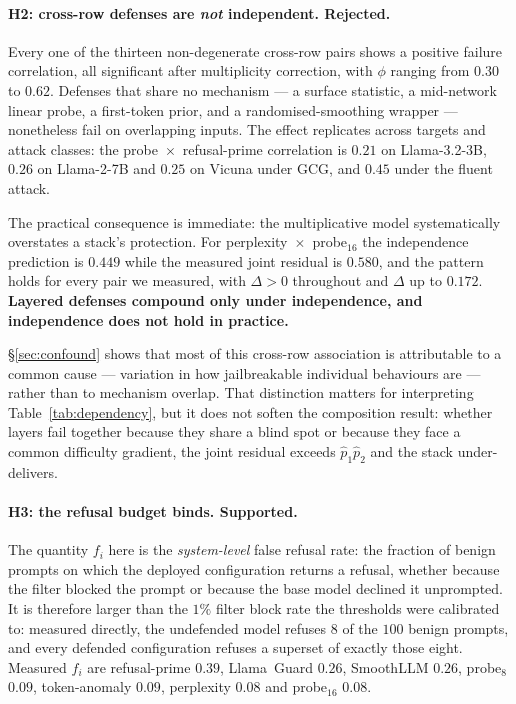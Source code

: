 \paragraph{H2: cross-row defenses are \emph{not} independent. Rejected.}
Every one of the thirteen non-degenerate cross-row pairs shows a positive failure
correlation, all significant after multiplicity correction, with $\phi$ ranging from $0.30$
to $0.62$. Defenses that share no mechanism --- a surface statistic, a mid-network linear
probe, a first-token prior, and a randomised-smoothing wrapper --- nonetheless fail on
overlapping inputs. The effect replicates across targets and attack classes: the
probe~$\times$~refusal-prime correlation is $0.21$ on Llama-3.2-3B, $0.26$ on Llama-2-7B and
$0.25$ on Vicuna under GCG, and $0.45$ under the fluent attack.

The practical consequence is immediate: the multiplicative model systematically overstates a
stack's protection. For perplexity~$\times$~probe$_{16}$ the independence prediction is
$0.449$ while the measured joint residual is $0.580$, and the pattern holds for every pair we
measured, with $\Delta>0$ throughout and $\Delta$ up to $0.172$. \textbf{Layered defenses
compound only under independence, and independence does not hold in practice.}

\S\ref{sec:confound} shows that most of this cross-row association is attributable to a
common cause --- variation in how jailbreakable individual behaviours are --- rather than to
mechanism overlap. That distinction matters for interpreting Table~\ref{tab:dependency}, but
it does not soften the composition result: whether layers fail together because they share a
blind spot or because they face a common difficulty gradient, the joint residual exceeds
$\hat p_1\hat p_2$ and the stack under-delivers.

\paragraph{H3: the refusal budget binds. Supported.}
\label{sec:h3-note}
The quantity $f_i$ here is the \emph{system-level} false refusal rate: the fraction of benign
prompts on which the deployed configuration returns a refusal, whether because the filter
blocked the prompt or because the base model declined it unprompted. It is therefore larger
than the $1\%$ filter block rate the thresholds were calibrated to: measured directly, the
undefended model refuses $8$ of the $100$ benign prompts, and every defended configuration
refuses a superset of exactly those eight. Measured $f_i$ are refusal-prime $0.39$,
Llama~Guard $0.26$, SmoothLLM $0.26$, probe$_8$ $0.09$, token-anomaly $0.09$, perplexity
$0.08$ and probe$_{16}$ $0.08$.

